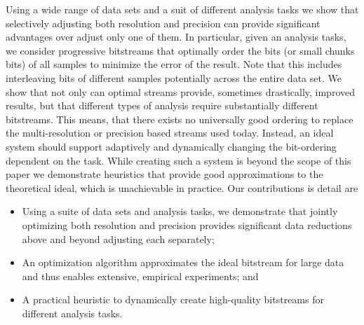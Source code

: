 Using a wide range of data sets and a suit of different analysis tasks
we show that selectively adjusting both resolution and precision can
provide significant advantages over adjust only one of them. In
particular, given an analysis tasks, we consider progressive
bitstreams that optimally order the bits (or small chunks bits) of all
samples to minimize the error of the result. Note that this includes
interleaving bits of different samples potentially across the entire
data set. We show that not only can optimal streams provide,
sometimes drastically, improved results, but that different types of
analysis require substantially different bitstreams. This means, that
there exists no universally good ordering to replace the
multi-resolution or precision based streams used today. Instead, an
ideal system should support adaptively and dynamically changing the
bit-ordering dependent on the task. While creating such a system is
beyond the scope of this paper we demonstrate heuristics that provide
good approximations to the theoretical ideal, which is unachievable in
practice. Our contributions is detail are

\begin{itemize}

\item Using a suite of data sets and analysis tasks, we demonstrate
  that jointly optimizing both resolution and precision provides
  significant data reductions above and beyond  adjusting each
  separately;

\item An optimization algorithm approximates the ideal
  bitstream for large data and thus enables extensive, empirical
  experiments; and

\item A practical heuristic to dynamically create
  high-quality bitstreams for different analysis tasks.

\end{itemize}

 




